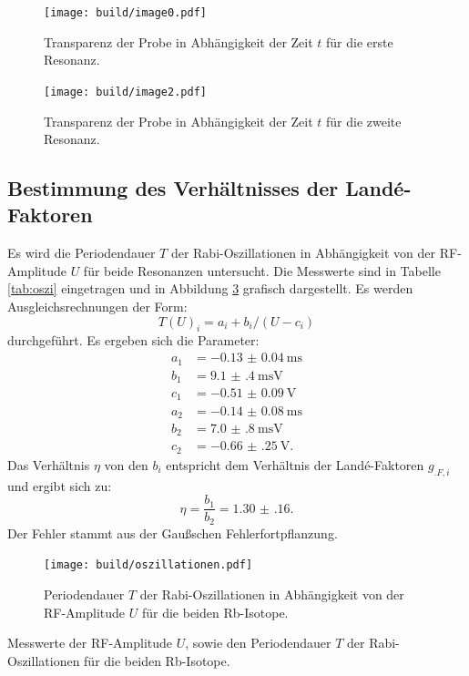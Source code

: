 \begin{figure}
	\centering
	\texttt{[image: build/image0.pdf]}
	\caption{Transparenz der Probe in Abhängigkeit der Zeit $t$ für die erste Resonanz.}
	\label{fig:messung2a}
\end{figure}

\begin{figure}
	\centering
	\texttt{[image: build/image2.pdf]}
	\caption{Transparenz der Probe in Abhängigkeit der Zeit $t$ für die zweite Resonanz.}
	\label{fig:messung2b}
\end{figure}

\subsection{Bestimmung des Verhältnisses der Landé-Faktoren}

Es wird die Periodendauer $T$ der Rabi-Oszillationen in Abhängigkeit von der RF-Amplitude $U$ für beide Resonanzen untersucht. Die Messwerte sind in Tabelle \ref{tab:oszi} eingetragen und in Abbildung \ref{fig:oszi} grafisch dargestellt.
Es werden Ausgleichsrechnungen der Form:
\[
T(U)_i = a_i+b_i/(U-c_i)
\] 
durchgeführt. Es ergeben sich die Parameter:
\begin{align*}
a_1 &= \SI{-0.13(4)}{\milli\second}\\
b_1 &= \SI{9.1(4)}{\milli\second\volt}\\
c_1 &= \SI{-0.51(9)}{\volt}\\
a_2 &= \SI{-0.14(8)}{\milli\second}\\
b_2 &= \SI{7.0(8)}{\milli\second\volt}\\
c_2 &= \SI{-0.66(25)}{\volt}\text{.}
\end{align*}
Das Verhältnis $\eta$ von den $b_i$ entspricht dem Verhältnis der Landé-Faktoren $g_{.F,i}$ und ergibt sich zu:
\[
\eta = \frac{b_1}{b_2}=\num{1.30(16)}\text{.}
\]
Der Fehler stammt aus der Gaußschen Fehlerfortpflanzung.

\begin{figure}
	\centering
	\texttt{[image: build/oszillationen.pdf]}
	\caption{Periodendauer $T$ der Rabi-Oszillationen in Abhängigkeit von der RF-Amplitude $U$ für die beiden Rb-Isotope.}
	\label{fig:oszi}
\end{figure}

\begin{table}
	\centering
	\caption{Messwerte der RF-Amplitude $U$, sowie den Periodendauer $T$ der Rabi-Oszillationen für die beiden Rb-Isotope.}
	
	\label{tab:oszi}
\end{table}